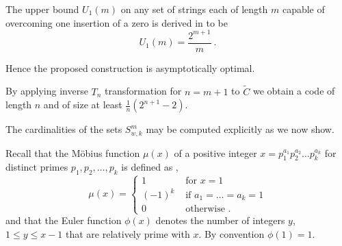 \documentclass[10pt,conference]{IEEEtran}
\begin{document}
The upper bound $U_1(m)$ on any set of strings each of length $m$
capable of overcoming one insertion of a zero is derived in
\cite{lev:66a} to be
\begin{equation}\label{ub0}U_1(m)=\frac{2^{m+1}}{m}~.\end{equation}

Hence the proposed construction is asymptotically optimal.

By applying inverse $T_n$ transformation for $n=m+1$ to $\tilde{C}$
we obtain a code of length $n$ and of size at least $\frac{1}{n}
                           \left(2^{n+1}-2\right)$.



The cardinalities of the sets $S_{w,k}^m$ may be computed explicitly
as we now show.

Recall that the M\"{o}bius function $\mu(x)$ of a positive integer
$x=p_1^{a_1}p_2^{a_2}\dots p_k^{a_k}$ for distinct primes
$p_1,p_2,\dots,p_k$ is defined as \cite{apostol},
\begin{equation}
\mu(x)=\left\{ \begin{array}{lll} 1 &\text{ for }x=1\\
(-1)^k &\text{ if }a_1=\dots=a_k=1\\
0 &\text{ otherwise }.
\end{array}\right.
\end{equation}and that the Euler function $\phi(x)$ denotes the number of
integers $y$, $1 \leq y \leq x-1$ that are relatively prime with
$x$. By convention $\phi(1)=1$.
\end{document}
